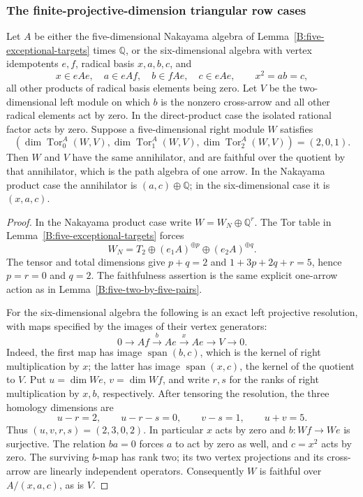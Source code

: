 \subsubsection{The finite-projective-dimension triangular row cases}

\begin{lemma}\label{B:six-pd2-row-pairs}
Let $A$ be either the five-dimensional Nakayama algebra of
Lemma~\ref{B:five-exceptional-targets} times $\mathbb Q$, or the
six-dimensional algebra with vertex idempotents $e,f$, radical
basis $x,a,b,c$, and
\[
 x\in eAe,\quad a\in eAf,\quad b\in fAe,\quad c\in eAe,
 \qquad x^2=ab=c,
\]
all other products of radical basis elements being zero.
Let $V$ be the two-dimensional left module on which $b$ is the
nonzero cross-arrow and all other radical elements act by zero.
In the direct-product case the isolated rational factor acts by zero.
Suppose a five-dimensional right module $W$ satisfies
\[
 (\dim\operatorname{Tor}_0^A(W,V),
   \dim\operatorname{Tor}_1^A(W,V),
   \dim\operatorname{Tor}_2^A(W,V))=(2,0,1).
\]
Then $W$ and $V$ have the same annihilator, and are faithful over
the quotient by that annihilator, which is the path algebra of one
arrow.  In the Nakayama product case the annihilator is
$(a,c)\oplus\mathbb Q$; in the six-dimensional case it is $(x,a,c)$.
\end{lemma}
\begin{proof}
In the Nakayama product case write $W=W_N\oplus\mathbb Q^r$.
The Tor table in Lemma~\ref{B:five-exceptional-targets} forces
\[
 W_N=T_2\oplus(e_1A)^{\oplus p}\oplus(e_2A)^{\oplus q}.
\]
The tensor and total dimensions give $p+q=2$ and
$1+3p+2q+r=5$, hence $p=r=0$ and $q=2$.
The faithfulness assertion is the same explicit one-arrow action
as in Lemma~\ref{B:five-two-by-five-pairs}.

For the six-dimensional algebra the following is an exact left
projective resolution, with maps specified by the images of their
vertex generators:
\[
 0\longrightarrow Af\xrightarrow{\ b\ }Ae
   \xrightarrow{\ x\ }Ae\longrightarrow V\longrightarrow0.
\]
Indeed, the first map has image $\operatorname{span}(b,c)$,
which is the kernel of right multiplication by $x$; the latter
has image $\operatorname{span}(x,c)$, the kernel of the quotient
to $V$.  Put $u=\dim We$, $v=\dim Wf$, and write $r,s$ for
the ranks of right multiplication by $x,b$, respectively.
After tensoring the resolution, the three homology dimensions are
\[
 u-r=2,\qquad u-r-s=0,\qquad v-s=1,
 \qquad u+v=5.
\]
Thus $(u,v,r,s)=(2,3,0,2)$.  In particular $x$ acts by zero and
$b:Wf\to We$ is surjective.  The relation $ba=0$ forces $a$ to
act by zero as well, and $c=x^2$ acts by zero.
The surviving $b$-map has rank two; its two vertex projections
and its cross-arrow are linearly independent operators.
Consequently $W$ is faithful over $A/(x,a,c)$, as is $V$.
\end{proof}

